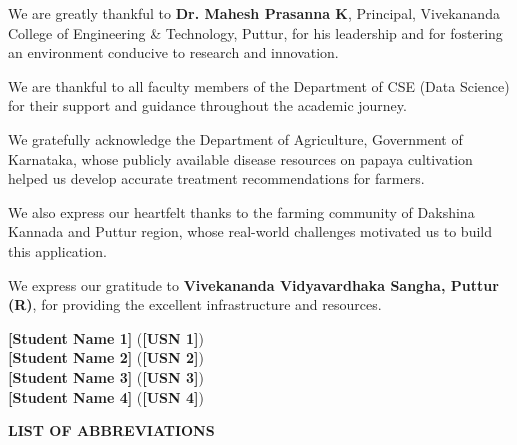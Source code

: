 \documentclass[12pt,a4paper]{report}
\begin{document}
\vspace{0.3cm}
We are greatly thankful to \textbf{Dr. Mahesh Prasanna K}, Principal, Vivekananda College of Engineering \& Technology, Puttur, for his leadership and for fostering an environment conducive to research and innovation.

\vspace{0.3cm}
We are thankful to all faculty members of the Department of CSE (Data Science) for their support and guidance throughout the academic journey.

\vspace{0.3cm}
We gratefully acknowledge the Department of Agriculture, Government of Karnataka, whose publicly available disease resources on papaya cultivation helped us develop accurate treatment recommendations for farmers.

\vspace{0.3cm}
We also express our heartfelt thanks to the farming community of Dakshina Kannada and Puttur region, whose real-world challenges motivated us to build this application.

\vspace{0.3cm}
We express our gratitude to \textbf{Vivekananda Vidyavardhaka Sangha, Puttur (R)}, for providing the excellent infrastructure and resources.

\vspace{1.5cm}
\begin{flushright}
\textbf{[Student Name 1]} (\textbf{[USN 1]})\\
\textbf{[Student Name 2]} (\textbf{[USN 2]})\\
\textbf{[Student Name 3]} (\textbf{[USN 3]})\\
\textbf{[Student Name 4]} (\textbf{[USN 4]})\\
\end{flushright}

\newpage
\tableofcontents
{}

\newpage
\listoffigures
{}

\newpage
\listoftables
{}

\newpage
\thispagestyle{plain}
\begin{center}
{\Large\bfseries LIST OF ABBREVIATIONS}
\end{center}
\vspace{0.5cm}
\end{document}
